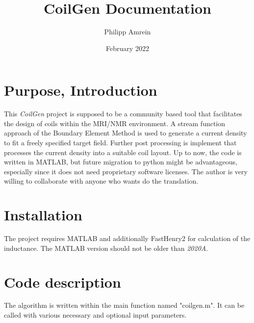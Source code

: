 \documentclass[a4paper,12pt]{book}
\begin{document}
\begin{titlepage}
\author{Philipp Amrein}
\title{CoilGen Documentation}
\date{February 2022}
\end{titlepage}


\maketitle
\tableofcontents

\newpage

\section{{Purpose, Introduction}}
This \textit{CoilGen} project is supposed to be a community based tool that facilitates the design of coils within the MRI/NMR environment. A stream function approach of the Boundary Element Method is used to generate a current density to fit a freely specified target field. Further post processing is implement that processes the current density into a suitable coil layout.
Up to now, the code is written in MATLAB, but future migration to python might be advantageous, especially since it does not need proprietary software licenses. The author is very willing to collaborate with anyone who wants do the translation.

\section{Installation}
The project requires MATLAB and additionally FastHenry2 for calculation of the inductance.  The MATLAB version should not be older than \textit{2020A}. 

\section{Code description}
The algorithm is written within the main function named "coilgen.m". It can be called with various necessary and optional input parameters.
\end{document}
